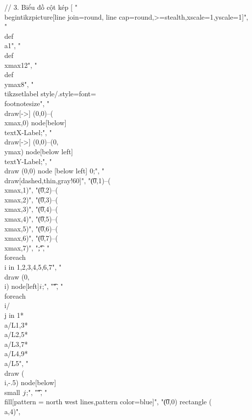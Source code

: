 // 3. Biểu đồ cột kép
[
"\\begin{tikzpicture}[line join=round, line cap=round,>=stealth,xscale=1,yscale=1]",
"\t\\def\\a{1}",
"\t\\def\\xmax{12}",
"\t\\def\\ymax{8}",
"\t\\tikzset{label style/.style={font=\\footnotesize}}",
"\t\\draw[->] (0,0)--(\\xmax,0) node[below] {\\text{X-Label}};",
"\t\\draw[->] (0,0)--(0,\\ymax) node[below left] {\\text{Y-Label}};",
"\t\\draw (0,0) node [below left] {$0$};",
"\t\\draw[dashed,thin,gray!60]",
"\t(0,1)--(\\xmax,1)",
"\t(0,2)--(\\xmax,2)",
"\t(0,3)--(\\xmax,3)",
"\t(0,4)--(\\xmax,4)",
"\t(0,5)--(\\xmax,5)",
"\t(0,6)--(\\xmax,6)",
"\t(0,7)--(\\xmax,7)",
"\t;",
"\t\\foreach \\i in {1,2,3,4,5,6,7}{",
	"\t\t\\draw (0,\\i) node[left]{$\\i$};",
	"\t}",
"\t\\foreach \\i/\\j in {1*\\a/L1,3*\\a/L2,5*\\a/L3,7*\\a/L4,9*\\a/L5}{",
	"\t\t\\draw (\\i,-.5) node[below]{\\small $\\j$};",
	"\t}",
"\t\\fill[pattern = north west lines,pattern color=blue]",
"\t(0,0) rectangle (\\a,4)",
